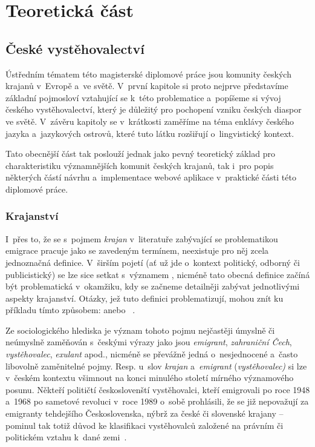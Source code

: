 \part{Teoretická část}

\hypertarget{ux10deskuxe9-vystux11bhovalectvuxed}{%
\chapter{České vystěhovalectví}\label{ux10deskuxe9-vystux11bhovalectvuxed}}

Ústředním tématem této magisterské diplomové práce jsou komunity českých krajanů v~Evropě a~ve světě. V~první kapitole si proto nejprve představíme základní pojmosloví vztahující se k~této problematice a~popíšeme si vývoj českého vystěhovalectví, který je důležitý pro pochopení vzniku českých diaspor ve světě. V~závěru kapitoly se v~krátkosti zaměříme na téma enklávy českého jazyka a~jazykových ostrovů, které tuto látku rozšiřují o~lingvistický kontext.

Tato obecnější část tak poslouží jednak jako pevný teoretický základ pro charakteristiku významnějších komunit českých krajanů, tak i~pro popis některých částí návrhu a~implementace webové aplikace v~praktické části této diplomové práce.

\hypertarget{krajanstvuxed}{%
\section{Krajanství}\label{krajanstvuxed}}

I~přes to, že se s~pojmem \emph{krajan} v~literatuře zabývající se problematikou emigrace pracuje jako se zavedeným termínem, neexistuje pro něj zcela jednoznačná definice. V~širším pojetí (ať už jde o~kontext politický, odborný či publicistický) se lze sice setkat s~významem , nicméně tato obecná definice začíná být problematická v~okamžiku, kdy se začneme detailněji zabývat jednotlivými aspekty krajanství. Otázky, jež tuto definici problematizují, mohou znít ku příkladu tímto způsobem:  anebo ~\parencite{Jakoubek2015}.

Ze sociologického hlediska je význam tohoto pojmu nejčastěji úmyslně či neúmyslně zaměňován s~českými výrazy jako jsou \emph{emigrant}, \emph{zahraniční Čech}, \emph{vystěhovalec}, \emph{exulant} apod., nicméně se převážně jedná o~nesjednocené a~často libovolně zaměnitelné pojmy. Resp. u~slov \emph{krajan} a~\emph{emigrant} (\emph{vystěhovalec)} si lze v~českém kontextu všimnout na konci minulého století mírného významového posunu. Někteří političtí českoslovenští vystěhovalci, kteří emigrovali po roce 1948 a~1968 po sametové revoluci v~roce 1989 o~sobě prohlásili, že se již nepovažují za emigranty tehdejšího Československa, nýbrž za české či slovenské krajany -- pominul tak totiž důvod ke klasifikaci vystěhovalců založené na právním či politickém vztahu k~dané zemi~\parencite{Broucek2017}.

